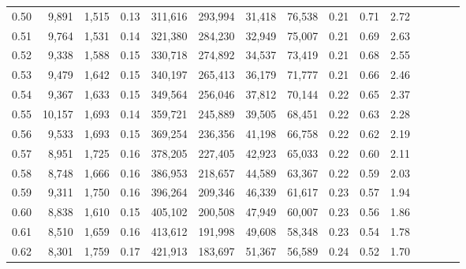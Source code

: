 \begin{tabular}{rrrcrrrrrrrrrrr}
0.50 &   9,891 &  1,515 &                                       0.13 &  311,616 &  293,994 &   31,418 &   76,538 &  0.21 &  0.71 &                         2.72 \\
0.51 &   9,764 &  1,531 &                                       0.14 &  321,380 &  284,230 &   32,949 &   75,007 &  0.21 &  0.69 &                         2.63 \\
0.52 &   9,338 &  1,588 &                                       0.15 &  330,718 &  274,892 &   34,537 &   73,419 &  0.21 &  0.68 &                         2.55 \\
0.53 &   9,479 &  1,642 &                                       0.15 &  340,197 &  265,413 &   36,179 &   71,777 &  0.21 &  0.66 &                         2.46 \\
0.54 &   9,367 &  1,633 &                                       0.15 &  349,564 &  256,046 &   37,812 &   70,144 &  0.22 &  0.65 &                         2.37 \\
0.55 &  10,157 &  1,693 &                                       0.14 &  359,721 &  245,889 &   39,505 &   68,451 &  0.22 &  0.63 &                         2.28 \\
0.56 &   9,533 &  1,693 &                                       0.15 &  369,254 &  236,356 &   41,198 &   66,758 &  0.22 &  0.62 &                         2.19 \\
0.57 &   8,951 &  1,725 &                                       0.16 &  378,205 &  227,405 &   42,923 &   65,033 &  0.22 &  0.60 &                         2.11 \\
0.58 &   8,748 &  1,666 &                                       0.16 &  386,953 &  218,657 &   44,589 &   63,367 &  0.22 &  0.59 &                         2.03 \\
0.59 &   9,311 &  1,750 &                                       0.16 &  396,264 &  209,346 &   46,339 &   61,617 &  0.23 &  0.57 &                         1.94 \\
0.60 &   8,838 &  1,610 &                                       0.15 &  405,102 &  200,508 &   47,949 &   60,007 &  0.23 &  0.56 &                         1.86 \\
0.61 &   8,510 &  1,659 &                                       0.16 &  413,612 &  191,998 &   49,608 &   58,348 &  0.23 &  0.54 &                         1.78 \\
0.62 &   8,301 &  1,759 &                                       0.17 &  421,913 &  183,697 &   51,367 &   56,589 &  0.24 &  0.52 &                         1.70 \\

\end{tabular}
